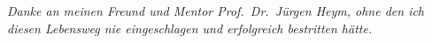 \clearpage
\thispagestyle{empty}

\begin{center}
\noindent
\emph{Danke an meinen Freund und Mentor Prof.~Dr.~Jürgen Heym, ohne den ich diesen Lebensweg nie eingeschlagen
und erfolgreich bestritten hätte.}
\end{center}


\restoregeometry

